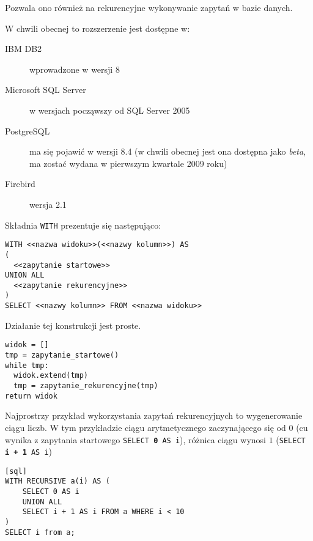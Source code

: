Pozwala ono również na rekurencyjne wykonywanie zapytań w bazie danych.

W chwili obecnej to rozszerzenie jest dostępne w:
\begin{description}
 \item[IBM DB2]
    wprowadzone w wersji 8
 \item[Microsoft SQL Server]
	w wersjach począwszy od SQL Server 2005
 \item[PostgreSQL]
	ma się pojawić w wersji 8.4 (w chwili obecnej jest ona dostępna jako \emph{beta}, ma zostać wydana w pierwszym kwartale 2009 roku)
 \item[Firebird]
	wersja 2.1 
\end{description}




Składnia \texttt{WITH} prezentuje się następująco:




\begin{verbatim}
WITH <<nazwa widoku>>(<<nazwy kolumn>>) AS
(
  <<zapytanie startowe>>
UNION ALL
  <<zapytanie rekurencyjne>>
)
SELECT <<nazwy kolumn>> FROM <<nazwa widoku>>
\end{verbatim}

Działanie tej konstrukcji jest proste.

\begin{verbatim}
widok = []
tmp = zapytanie_startowe()
while tmp:
  widok.extend(tmp)
  tmp = zapytanie_rekurencyjne(tmp)
return widok
\end{verbatim}

Najprostrzy przykład wykorzystania zapytań rekurencyjnych to wygenerowanie ciągu liczb. 
W tym przykładzie ciągu arytmetycznego zaczynającego się od $0$ (cu wynika z zapytania startowego \texttt{SELECT \textbf{0} AS i}), 
różnica ciągu wynosi $1$ (\texttt{SELECT \textbf{i + 1} AS i})

\begin{verbatim}[sql]
WITH RECURSIVE a(i) AS (
    SELECT 0 AS i
    UNION ALL
    SELECT i + 1 AS i FROM a WHERE i < 10
)
SELECT i from a;
\end{verbatim}




